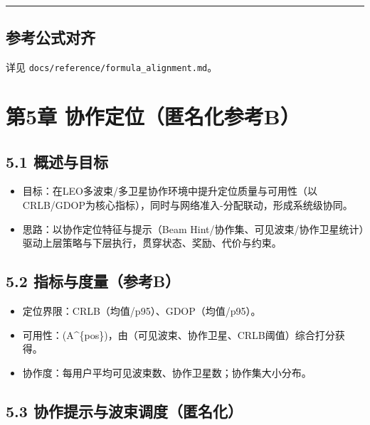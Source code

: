 \begin{center}\rule{0.5\linewidth}{0.5pt}\end{center}

\subsection{参考公式对齐}\label{ux53c2ux8003ux516cux5f0fux5bf9ux9f50-1}

详见 \texttt{docs/reference/formula\_alignment.md}。

\section{第5章
协作定位（匿名化参考B）}\label{ux7b2c5ux7ae0-ux534fux4f5cux5b9aux4f4dux533fux540dux5316ux53c2ux8003b}

\subsection{5.1 概述与目标}\label{ux6982ux8ff0ux4e0eux76eeux6807}

\begin{itemize}
\tightlist
\item
  目标：在LEO多波束/多卫星协作环境中提升定位质量与可用性（以CRLB/GDOP为核心指标），同时与网络准入-分配联动，形成系统级协同。
\item
  思路：以协作定位特征与提示（Beam
  Hint/协作集、可见波束/协作卫星统计）驱动上层策略与下层执行，贯穿状态、奖励、代价与约束。
\end{itemize}

\subsection{5.2
指标与度量（参考B）}\label{ux6307ux6807ux4e0eux5ea6ux91cfux53c2ux8003b}

\begin{itemize}
\tightlist
\item
  定位界限：CRLB（均值/p95）、GDOP（均值/p95）。
\item
  可用性：(A\^{}\{pos\}\in[0,1])，由（可见波束、协作卫星、CRLB阈值）综合打分获得。
\item
  协作度：每用户平均可见波束数、协作卫星数；协作集大小分布。
\end{itemize}

\subsection{5.3
协作提示与波束调度（匿名化）}\label{ux534fux4f5cux63d0ux793aux4e0eux6ce2ux675fux8c03ux5ea6ux533fux540dux5316}

